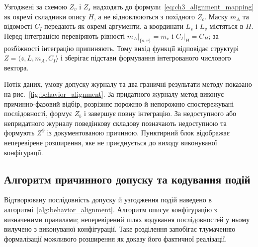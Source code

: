 Узгоджені за схемою $Z_v$ і $Z_s$ надходять до формули~\eqref{eq:ch3_alignment_mapping} як окремі складники опису $H$, а не відновлюються з похідного $Z_c$. Маску $m_A$ та відомості $C_I$ передають як окремі аргументи, а координати $L_s$ і $L_v$ містяться в $H$. Перед інтеграцією перевіряють рівності $m_A|_{\{s,v\}}=m_c$ і $C_I|_H=C_H$; за розбіжності інтеграцію припиняють. Тому вихід функції відповідає структурі $Z=\langle z,L,m_A,C_I\rangle$ і зберігає підстави формування інтегрованого числового вектора.

Потік даних, умову допуску журналу та два граничні результати методу показано на рис.~\ref{fig:behavior_alignment}. За придатного журналу метод виконує причинно-фазовий відбір, розрізняє порожню й непорожню спостережувані послідовності, формує $Z_b$ і завершує повну інтеграцію. За недоступного або непридатного журналу поведінкову складову позначають недоступною та формують $Z^{\partial}$ із документованою причиною. Пунктирний блок відображає неперевірене розширення, яке не приєднується до виходу виконуваної конфігурації.



\subsection{Алгоритм причинного допуску та кодування подій}

Відтворювану послідовність допуску й узгодження подій наведено в алгоритмі~\ref{alg:behavior_alignment}. Алгоритм описує конфігурацію з визначеними правилами; неперевірений шлях кодування послідовностей у ньому вилучено з виконуваної конфігурації. Таке розділення запобігає тлумаченню формалізації можливого розширення як доказу його фактичної реалізації.

\clearpage

